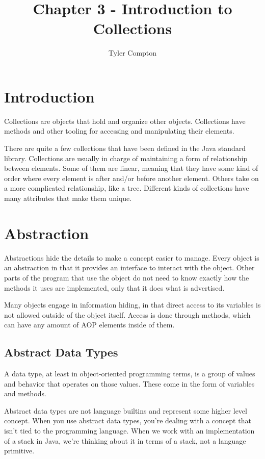 \documentclass{article}
\author{Tyler Compton}
\title{Chapter 3 - Introduction to Collections}
\begin{document}
\maketitle
\tableofcontents

\section{Introduction}
Collections are objects that hold and organize other objects. Collections have
methods and other tooling for accessing and manipulating their elements.

There are quite a few collections that have been defined in the Java standard
library. Collections are usually in charge of maintaining a form of
relationship between elements. Some of them are linear, meaning that they have
some kind of order where every element is after and/or before another element.
Others take on a more complicated relationship, like a tree. Different kinds of
collections have many attributes that make them unique.

\section{Abstraction}
Abstractions hide the details to make a concept easier to manage. Every object
is an abstraction in that it provides an interface to interact with the object.
Other parts of the program that use the object do not need to know exactly how
the methods it uses are implemented, only that it does what is advertised.

Many objects engage in information hiding, in that direct access to its
variables is not allowed outside of the object itself. Access is done through
methods, which can have any amount of AOP elements inside of them.

\subsection{Abstract Data Types}
A data type, at least in object-oriented programming terms, is a group of
values and behavior that operates on those values. These come in the form of
variables and methods.

Abstract data types are not language builtins and represent some higher level
concept. When you use abstract data types, you're dealing with a concept that
isn't tied to the programming language. When we work with an implementation of
a stack in Java, we're thinking about it in terms of a stack, not a language
primitive.
\end{document}
